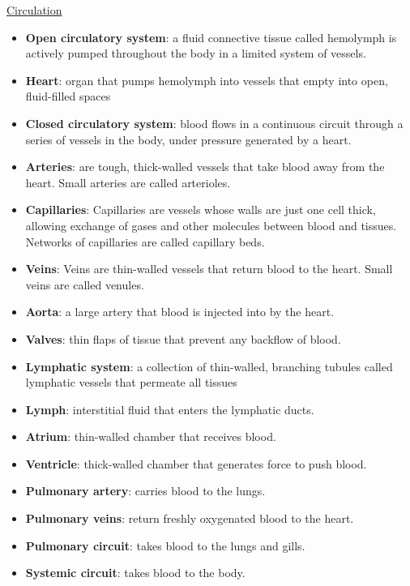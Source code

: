 \documentclass[12pt,letterpaper]{article}
\begin{document}
\hypertarget{42.5}{}
\begin{secbox}{\hyperlink{42}{Circulation}}{
    \begin{itemize}
        \item \textbf{Open circulatory system}: a fluid connective tissue called
        hemolymph is actively pumped throughout the body in a limited
        system of vessels.
        \item \textbf{Heart}: organ that pumps hemolymph into vessels that empty into open, fluid-filled spaces
        \item \textbf{Closed circulatory system}: blood flows in a continuous
        circuit through a series of vessels in the body, under pressure
        generated by a heart. 
        \item \textbf{Arteries}: are tough, thick-walled vessels that take blood away
        from the heart. Small arteries are called arterioles.
        \item \textbf{Capillaries}: Capillaries are vessels whose walls are just one cell thick,
        allowing exchange of gases and other molecules between blood
        and tissues. Networks of capillaries are called capillary beds.
        \item \textbf{Veins}: Veins are thin-walled vessels that return blood to the heart.
        Small veins are called venules.
        \item \textbf{Aorta}: a large artery that blood is injected into by the heart.
        \item \textbf{Valves}: thin flaps of tissue that prevent any backflow of blood.
        \item \textbf{Lymphatic system}: a collection of thin-walled, branching tubules called lymphatic vessels
        that permeate all tissues
        \item \textbf{Lymph}: interstitial fluid that enters the lymphatic ducts.
        \item \textbf{Atrium}: thin-walled chamber that receives blood.
        \item \textbf{Ventricle}: thick-walled chamber that generates force to push blood.
        \item \textbf{Pulmonary artery}: carries blood to the lungs.
        \item \textbf{Pulmonary veins}: return freshly oxygenated blood
        to the heart.
        \item \textbf{Pulmonary circuit}: takes blood to the lungs and gills.
        \item \textbf{Systemic circuit}: takes blood to the body.

\end{itemize}}
\end{secbox}
\end{document}
